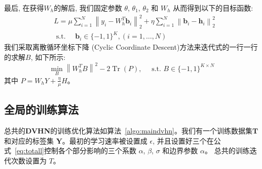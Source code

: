 最后, 在获得$W_h$的解后, 我们固定参数 $\theta$, $\theta_1$, $\theta_2$ 和 $W_h$ 从而得到以下的目标函数: 
\begin{equation}
    \begin{aligned}
&L=\mu \sum_{i=1}^{N}\left\|y_{i}-W_h^{T} \mathbf{b}_{i}\right\|_{2}^{2}+\eta \sum_{i=1}^{N}\left\|\mathbf{b}_{i}-\mathbf{h}_{i}\right\|_{2}^{2} \\
&\text { s.t. } \quad \mathbf{b}_{i} \in\{-1,1\}^{K},(i=1, \ldots, N)
\end{aligned}
\end{equation} 
我们采取离散循环坐标下降 (Cyclic Coordinate Descent)方法来迭代式的一行一行的求解$B$, 如下所示:
\begin{equation}
    \min _{B}\left\|W_h^{T} B\right\|^{2}-2 \operatorname{Tr}(P), \quad \text { s.t. } B \in\{-1,1\}^{K \times N}
    \label{eq:binary}
\end{equation}
其中 $P=W_h Y+\frac{\eta}{\mu} H$。

\subsection{全局的训练算法}
总共的\textbf{DVHN}的训练优化算法如算法~\ref{algo:maindvhn}。我们有一个训练数据集$\mathbf{T}$和对应的标签集 $\mathbf{Y}$。最初的学习速率被设置成 $\epsilon$, 并且设置好三个在公式~\ref{eq:totall}控制各个部分影响的三个系数 $\alpha$, $\beta$, $\sigma$ 和边界参数 $\alpha$。 总共的训练迭代次数设置为 $T$。 \par

